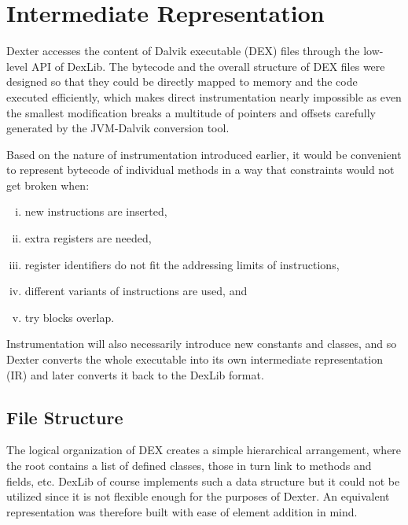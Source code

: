 \documentclass[12pt,twoside,notitlepage]{report}
\begin{document}
\section{Intermediate Representation}

Dexter accesses the content of Dalvik executable (DEX) files through the low-level API of DexLib. The bytecode and the overall structure of DEX files were designed so that they could be directly mapped to memory and the code executed efficiently, which makes direct instrumentation nearly impossible as even the smallest modification breaks a multitude of pointers and offsets carefully generated by the JVM-Dalvik conversion tool.

Based on the nature of instrumentation introduced earlier, it would be convenient to represent bytecode of individual methods in a way that constraints would not get broken when:
\begin{enumerate}[(i)]
\item new instructions are inserted,
\item extra registers are needed,
\item register identifiers do not fit the addressing limits of instructions,
\item different variants of instructions are used, and
\item try blocks overlap.
\end{enumerate}
Instrumentation will also necessarily introduce new constants and classes, and so Dexter converts the whole executable into its own intermediate representation (IR) and later converts it back to the DexLib format.

\subsection{File Structure}

The logical organization of DEX creates a simple hierarchical arrangement, where the root contains a list of defined classes, those in turn link to methods and fields, etc. DexLib of course implements such a data structure but it could not be utilized since it is not flexible enough for the purposes of Dexter. An equivalent representation was therefore built with ease of element addition in mind.

\end{document}
